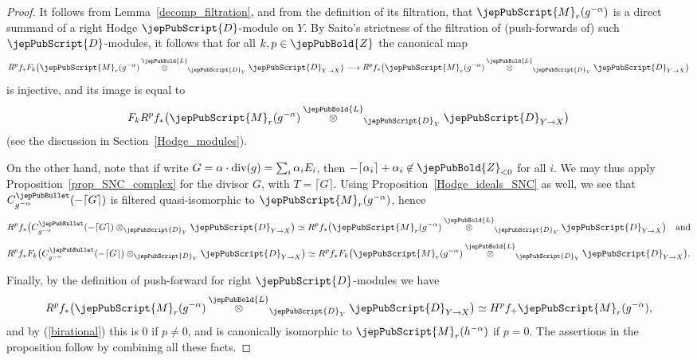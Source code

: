 \begin{proof}
It follows from Lemma~\ref{decomp_filtration}, and from the definition of its filtration, that $\jepPubScript{M}_r(g^{-\alpha})$ is 
a direct summand of a right Hodge $\jepPubScript{D}$-module on $Y$. By Saito's strictness of the filtration of (push-forwards of) such $\jepPubScript{D}$-modules, it follows that for all $k,p\in\jepPubBold{Z}$ the canonical map
$$R^pf_*F_k\big(\jepPubScript{M}_r(g^{-\alpha})\overset{\jepPubBold{L}}{\otimes}_{\jepPubScript{D}_Y}\jepPubScript{D}_{Y\to X}\big)\longrightarrow R^pf_*\big(\jepPubScript{M}_r(g^{-\alpha})\overset{\jepPubBold{L}}{\otimes}_{\jepPubScript{D}_Y}\jepPubScript{D}_{Y\to X}\big)$$
is injective, and its image is equal to
$$F_kR^pf_*\big(\jepPubScript{M}_r(g^{-\alpha})\overset{\jepPubBold{L}}{\otimes}_{\jepPubScript{D}_Y}\jepPubScript{D}_{Y\to X}\big)$$
(see the discussion in Section~\ref{Hodge_modules}).

On the other hand, note that if write 
$G=\alpha\cdot {\rm div}(g)=\sum_i\alpha_iE_i$, then $-\lceil\alpha_i\rceil+\alpha_i\not\in\jepPubBold{Z}_{<0}$ for all $i$.
We may thus apply Proposition~\ref{prop_SNC_complex} for the divisor $G$, with $T=\lceil G\rceil$.
Using Proposition~\ref{Hodge_ideals_SNC} as well,
we see that $C^{\jepPubBullet}_{g^{-\alpha}}(-\lceil G\rceil)$ is filtered quasi-isomorphic to
$\jepPubScript{M}_r(g^{-\alpha})$, hence 
$$R^pf_*\big(C^{\jepPubBullet}_{g^{-\alpha}}(-\lceil G\rceil)\otimes_{\jepPubScript{D}_Y}\jepPubScript{D}_{Y\to X}\big)\simeq R^pf_*\big(\jepPubScript{M}_r(g^{-\alpha})\overset{\jepPubBold{L}}{\otimes}_{\jepPubScript{D}_Y}\jepPubScript{D}_{Y\to X}\big)\quad\text{and}$$
$$R^pf_*F_k\big(C^{\jepPubBullet}_{g^{-\alpha}}(-\lceil G\rceil)\otimes_{\jepPubScript{D}_Y}\jepPubScript{D}_{Y\to X}\big)\simeq 
R^pf_*F_k\big(\jepPubScript{M}_r(g^{-\alpha})\overset{\jepPubBold{L}}{\otimes}_{\jepPubScript{D}_Y}\jepPubScript{D}_{Y\to X}\big).$$

Finally, by the definition of push-forward for right $\jepPubScript{D}$-modules we have
$$R^pf_*\big(\jepPubScript{M}_r(g^{-\alpha})\overset{\jepPubBold{L}}{\otimes}_{\jepPubScript{D}_Y}\jepPubScript{D}_{Y\to X}\big)\simeq 
H^pf_+\jepPubScript{M}_r(g^{-\alpha}),$$
and by (\ref{birational}) this is $0$ if $p\neq 0$, and is canonically isomorphic to $\jepPubScript{M}_r (h^{-\alpha})$ if $p=0$. 
The assertions in the proposition follow by combining all these facts.
\end{proof}
